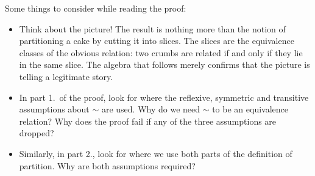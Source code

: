 Some things to consider while reading the proof:
\begin{itemize}
  \item Think about the picture! The result is nothing more than the notion of partitioning a cake by cutting it into slices. The slices are the equivalence classes of the obvious relation: two crumbs are related if and only if they lie in the same slice. The algebra that follows merely confirms that the picture is telling a legitimate story.
  \item In part 1.\ of the proof, look for where the reflexive, symmetric and transitive assumptions about $\sim$ are used. Why do we need $\sim$ to be an equivalence relation? Why does the proof fail if any of the three assumptions are dropped?
  \item Similarly, in part 2., look for where we use both parts of the definition of partition. Why are both assumptions required?
\end{itemize}



